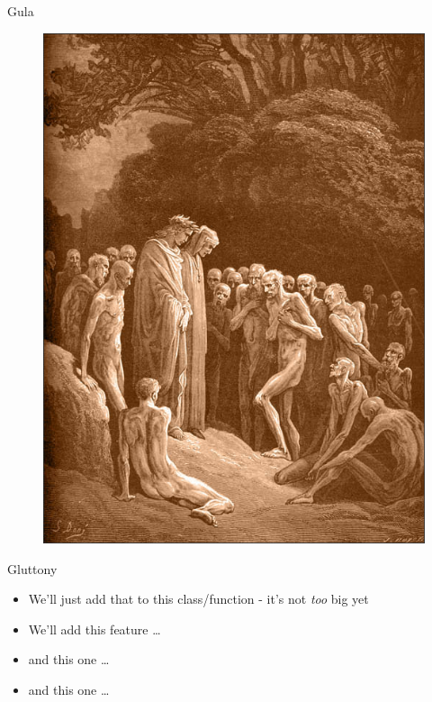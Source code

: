 \documentclass[12pt,xcolor=x11names]{beamer}
\begin{document}
\begin{frame}{Gula}
    \begin{figure}
        \centering \includegraphics[height=0.75\textheight]{images/gluttony.jpg}
    \end{figure}
\end{frame}
\begin{frame}{Gluttony}
    \begin{itemize}
        \item We'll just add that to this class/function - it's not \emph{too} big yet
        \item We'll add this feature \dots
            \pause
        \item and this one \ldots
            \pause
        \item and this one \ldots
    \end{itemize}
\end{frame}
\end{document}
